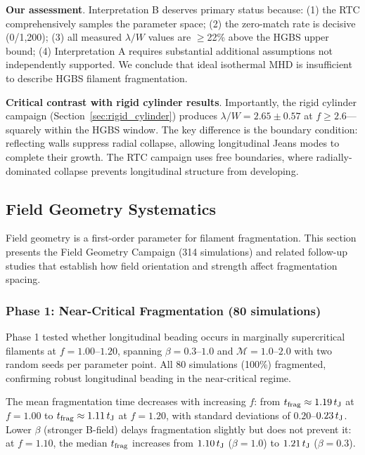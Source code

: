 \documentclass[twocolumn]{mnras}
\begin{document}
\textbf{Our assessment}. Interpretation B deserves primary status because: (1) the RTC comprehensively samples the parameter space; (2) the zero-match rate is decisive (0/1,200); (3) all measured $\lambda/W$ values are $\geq$22\% above the HGBS upper bound; (4) Interpretation A requires substantial additional assumptions not independently supported. We conclude that ideal isothermal MHD is insufficient to describe HGBS filament fragmentation.

\textbf{Critical contrast with rigid cylinder results}. Importantly, the rigid cylinder campaign (Section~\ref{sec:rigid_cylinder}) produces $\lambda/W = 2.65 \pm 0.57$ at $f \geq 2.6$—squarely within the HGBS window. The key difference is the boundary condition: reflecting walls suppress radial collapse, allowing longitudinal Jeans modes to complete their growth. The RTC campaign uses free boundaries, where radially-dominated collapse prevents longitudinal structure from developing.

\subsection{Field Geometry Systematics}

Field geometry is a first-order parameter for filament fragmentation. This section presents the Field Geometry Campaign (314 simulations) and related follow-up studies that establish how field orientation and strength affect fragmentation spacing.

\subsubsection{Phase 1: Near-Critical Fragmentation (80 simulations)}

Phase 1 tested whether longitudinal beading occurs in marginally supercritical filaments at $f = 1.00$--$1.20$, spanning $\beta = 0.3$--$1.0$ and $\mathcal{M} = 1.0$--$2.0$ with two random seeds per parameter point. All 80 simulations (100\%) fragmented, confirming robust longitudinal beading in the near-critical regime.

The mean fragmentation time decreases with increasing $f$: from $t_{\rm frag} \approx 1.19\,t_{\rm J}$ at $f = 1.00$ to $t_{\rm frag} \approx 1.11\,t_{\rm J}$ at $f = 1.20$, with standard deviations of $0.20$--$0.23\,t_{\rm J}$. Lower $\beta$ (stronger B-field) delays fragmentation slightly but does not prevent it: at $f = 1.10$, the median $t_{\rm frag}$ increases from $1.10\,t_{\rm J}$ ($\beta = 1.0$) to $1.21\,t_{\rm J}$ ($\beta = 0.3$).
\end{document}
